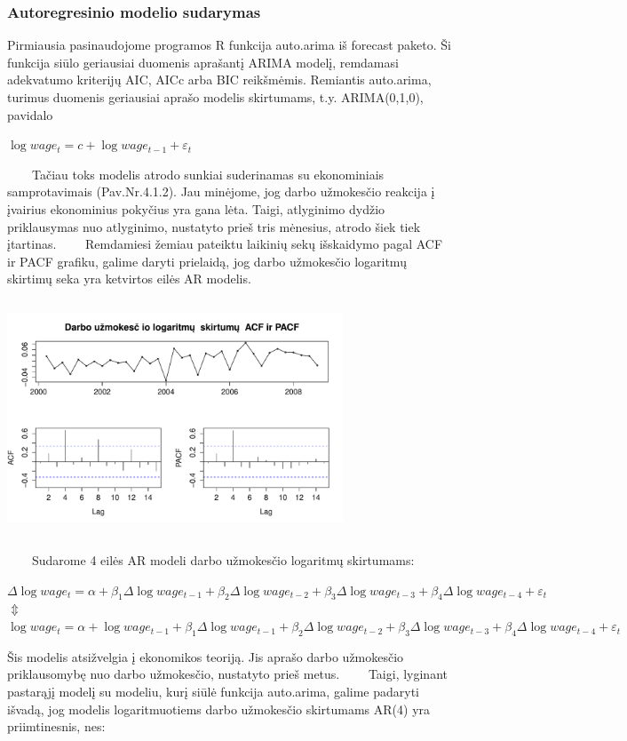 \documentclass[12pt,a4paper]{article}
\theoremstyle{change}\newtheorem{salyga}{Uždavinys}
\begin{document}
\subsubsection{Autoregresinio modelio sudarymas}
\hspace{40pt}Pirmiausia pasinaudojome programos R funkcija auto.arima iš forecast paketo. Ši funkcija siūlo geriausiai duomenis aprašantį ARIMA modelį, remdamasi adekvatumo kriterijų AIC, AICc arba BIC reikšmėmis. Remiantis auto.arima, turimus duomenis geriausiai aprašo modelis skirtumams, t.y. ARIMA(0,1,0), pavidalo
\begin{center}
\large $  \log wage_t=c+\log wage_{t-1}+\varepsilon_t$
\end{center}
\vskip 8pt
$\qquad$Tačiau toks modelis atrodo sunkiai suderinamas su ekonominiais samprotavimais (Pav.Nr.4.1.2). Jau minėjome, jog darbo užmokesčio reakcija į įvairius ekonominius pokyčius yra gana lėta. Taigi, atlyginimo dydžio priklausymas nuo atlyginimo, nustatyto prieš tris mėnesius, atrodo šiek tiek įtartinas.
\vskip 8pt
$\qquad$Remdamiesi žemiau pateiktu laikinių sekų išskaidymo pagal ACF ir PACF grafiku, galime daryti prielaidą, jog darbo užmokesčio logaritmų skirtimų seka yra ketvirtos eilės AR modelis. 
\vskip 8pt

\begin{center}
\includegraphics[width=100mm,height=70mm]{pacf}
\end{center}
\vskip 8pt
$\qquad$Sudarome 4 eilės AR modeli darbo užmokesčio logaritmų skirtumams:

\begin{center}
\large$ \Delta\log wage_t=\alpha+\beta_1\Delta\log wage_{t-1}+\beta_2\Delta\log wage_{t-2}+\beta_3\Delta\log wage_{t-3}+\beta_4\Delta\log wage_{t-4} +\varepsilon_t$ 
\large\\ $ \Updownarrow $
\large\\$ \log wage_t=\alpha+\log wage_{t-1}+\beta_1\Delta\log wage_{t-1}+\beta_2\Delta\log wage_{t-2}+\beta_3\Delta\log wage_{t-3}+\beta_4\Delta\log wage_{t-4}+\varepsilon_t $ 
\end{center}
Šis modelis atsižvelgia į ekonomikos teoriją. Jis aprašo darbo užmokesčio priklausomybę nuo darbo užmokesčio, nustatyto prieš metus. 
\vskip 8pt
$\qquad$Taigi, lyginant pastarąjį modelį su modeliu, kurį siūlė funkcija auto.arima, galime padaryti išvadą, jog modelis logaritmuotiems darbo užmokesčio skirtumams AR(4) yra priimtinesnis, nes:
\end{document}
